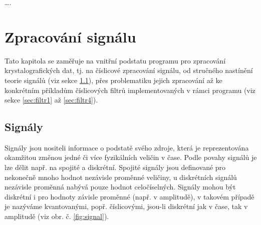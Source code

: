 \documentclass[a4paper, 12pt]{article}
\begin{document}
\ldots .


\newpage
\section{Zpracování signálu}
Tato kapitola se zaměřuje na vnitřní podstatu programu pro zpracování krystalografických dat, tj. na číslicové zpracování signálu, od stručného nastínění teorie signálů (viz sekce \ref{sec:signal}), přes problematiku jejich zpracování až ke konkrétním příkladům číslicových filtrů implementovaných v rámci programu (viz sekce \ref{sec:filtr1} až \ref{sec:filtr4}).

\subsection{Signály} \label{sec:signal}
Signály jsou nositeli informace o podstatě svého zdroje, která je reprezentována okamžitou změnou jedné či více fyzikálních veličin v čase. \cite{uhlíř&sovka2002} Podle povahy signálů je lze dělit např. na spojité a diskrétní. Spojité signály jsou definované pro nekonečně mnoho hodnot nezávisle proměnné veličiny, u diskrétních signálů nezávisle proměnná nabývá pouze hodnot celočíselných. Signály mohou být diskrétní i pro hodnoty závisle proměnné (např. v amplitudě), v takovém případě je nazýváme kvantovanými, popř. číslicovými, jsou-li diskrétní jak v čase, tak v amplitudě (viz obr. č. \ref{fig:signal}).
\end{document}
